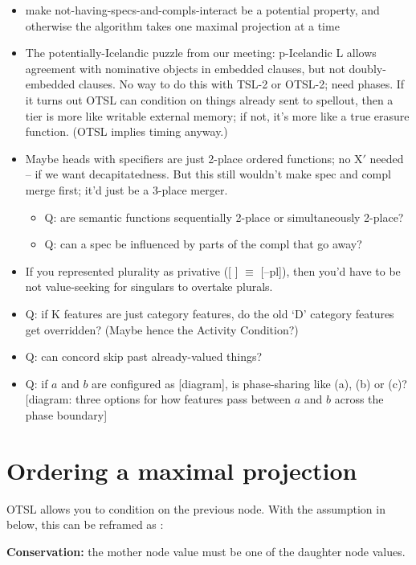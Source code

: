 
\begin{itemize}
\item make not-having-specs-and-compls-interact be a potential property, and otherwise the algorithm takes one maximal projection at a time
\item The potentially-Icelandic puzzle from our meeting: p-Icelandic L allows agreement with nominative objects in embedded clauses, but not doubly-embedded clauses. No way to do this with TSL-2 or OTSL-2; need phases. If it turns out OTSL can condition on things already sent to spellout, then a tier is more like writable external memory; if not, it's more like a true erasure function. (OTSL implies timing anyway.)
\item Maybe heads with specifiers are just 2-place ordered functions; no X$'$ needed -- if we want decapitatedness. But this still wouldn't make spec and compl merge first; it'd just be a 3-place merger.
  \begin{itemize}
  \item Q: are semantic functions sequentially 2-place or simultaneously 2-place?
  \item Q: can a spec be influenced by parts of the compl that go away?
  \end{itemize}
\item If you represented plurality as privative ([ ] $\equiv$ [–pl]), then you'd have to be not value-seeking for singulars to overtake plurals.
\item Q: if K features are just category features, do the old `D' category features get overridden? (Maybe hence the Activity Condition?)
\item Q: can concord skip past already-valued things?
\item Q: if $a$ and $b$ are configured as [diagram], is phase-sharing like (a), (b) or (c)? [diagram: three options for how features pass between $a$ and $b$ across the phase boundary]
\end{itemize}

\section{Ordering a maximal projection}

OTSL allows you to condition on the previous node. With the assumption in \Next{} below, this can be reframed as \NNext:

\ex \textbf{Conservation:} the mother node value must be one of the daughter node values. \xe

